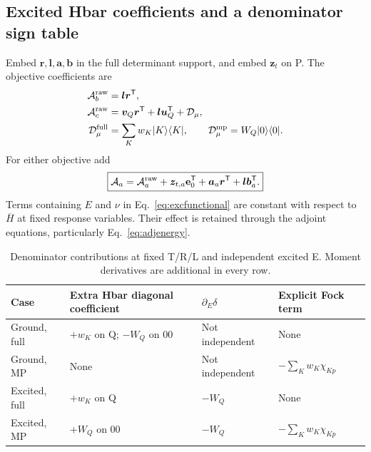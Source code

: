 \documentclass[11pt,letterpaper]{article}
\numberwithin{equation}{section}
\newcommand{\ket}[1]{\lvert #1\rangle}
\newcommand{\bra}[1]{\langle #1\rvert}
\newcommand{\bH}{\overline H}
\newcommand{\T}{\mathsf T}
\newcommand{\evec}{\mathbf e_0}
\begin{document}
\subsection{Excited Hbar coefficients and a denominator sign table}
Embed $\bm r,\bm l,\bm a,\bm b$ in the full determinant support, and embed
$\bm z_t$ on P. The objective coefficients are
\begin{align}
 \mathcal A_b^{\rm raw}&=\bm l\bm r^{\T},\\
 \mathcal A_c^{\rm raw}&=\bm v_Q\bm r^{\T}+\bm l\bm u_Q^{\T}
                  +\mathcal D_\mu,\\
 \mathcal D_\mu^{\rm full}&=\sum_K w_K\ket{K}\bra{K},\qquad
 \mathcal D_\mu^{\rm mp}=W_Q\ket{0}\bra{0}.
 \label{eq:excrawcoeff}
\end{align}
For either objective add
\begin{equation}
 \boxed{\mathcal A_a=\mathcal A_a^{\rm raw}
    +\bm z_{t,a}\evec^{\T}+\bm a_a\bm r^{\T}
                                  +\bm l\bm b_a^{\T}.}
 \label{eq:exccoeff}
\end{equation}
Terms containing $E$ and $\nu$ in Eq.~\eqref{eq:excfunctional} are constant
with respect to $\bH$ at fixed response variables. Their effect is retained
through the adjoint equations, particularly Eq.~\eqref{eq:adjenergy}.

\begin{table}[htbp]\centering\small
\begin{tabular}{llll}
\toprule
Case & Extra Hbar diagonal coefficient & $\partial_E\delta$ & Explicit Fock term\\
\midrule
Ground, full & $+w_K$ on Q; $-W_Q$ on $00$ & Not independent & None\\
Ground, MP & None & Not independent & $-\sum_Kw_K\chi_{Kp}$\\
Excited, full & $+w_K$ on Q & $-W_Q$ & None\\
Excited, MP & $+W_Q$ on $00$ & $-W_Q$ & $-\sum_Kw_K\chi_{Kp}$\\
\bottomrule
\end{tabular}
\caption{Denominator contributions at fixed T/R/L and independent excited E.
Moment derivatives are additional in every row.}\label{tab:signs}
\end{table}


\end{document}
